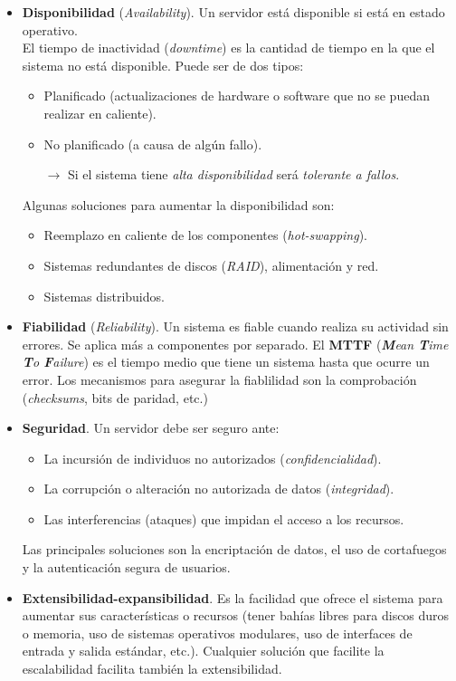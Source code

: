 \documentclass[12pt,spanish]{article}
\begin{document}
\begin{itemize}
	\item \textbf{Disponibilidad} (\textit{Availability}). Un servidor está disponible si está en estado operativo.\\ El tiempo de inactividad (\textit{downtime}) es la cantidad de tiempo en la que el sistema no está disponible. Puede ser de dos tipos:
	\begin{itemize}
		\item Planificado (actualizaciones de hardware o software que no se puedan realizar en caliente).
		\item No planificado (a causa de algún fallo).

		$\rightarrow$ Si el sistema tiene \emph{alta disponibilidad} será \emph{tolerante a fallos}.
	\end{itemize}
	\newpage
	Algunas soluciones para aumentar la disponibilidad son:
	\begin{itemize}
		\item Reemplazo en caliente de los componentes (\textit{hot-swapping}).
		\item Sistemas redundantes de discos (\textit{RAID}), alimentación y red.
		\item Sistemas distribuidos.
	\end{itemize}
	\item \textbf{Fiabilidad} (\textit{Reliability}). Un sistema es fiable cuando realiza su actividad sin errores. Se aplica más a componentes por separado. El \textbf{MTTF} (\textit{\textbf{M}ean \textbf{T}ime \textbf{T}o \textbf{F}ailure}) es el tiempo medio que tiene un sistema hasta que ocurre un error. Los mecanismos para asegurar la fiablilidad son la comprobación (\textit{checksums}, bits de paridad, etc.)
	\item \textbf{Seguridad}. Un servidor debe ser seguro ante:
	\begin{itemize}
		\item La incursión de individuos no autorizados (\textit{confidencialidad}).
		\item La corrupción o alteración no autorizada de datos (\textit{integridad}).
		\item Las interferencias (ataques) que impidan el acceso a los recursos.
	\end{itemize}
	Las principales soluciones son la encriptación de datos, el uso de cortafuegos y la autenticación segura de usuarios.
	\item \textbf{Extensibilidad-expansibilidad}. Es la facilidad que ofrece el sistema para aumentar sus características o recursos (tener bahías libres para discos duros o memoria, uso de sistemas operativos modulares, uso de interfaces de entrada y salida estándar, etc.). Cualquier solución que facilite la escalabilidad facilita también la extensibilidad.

\end{itemize}
\end{document}
